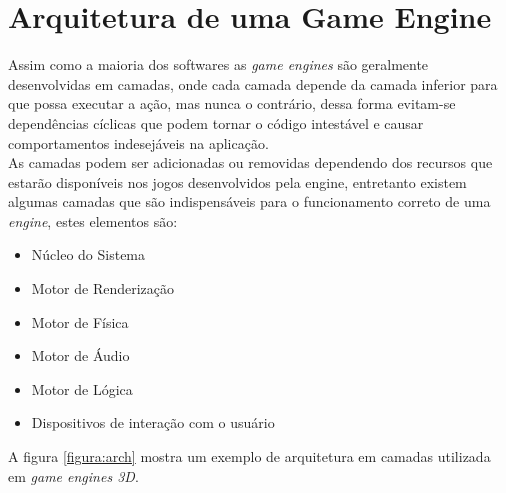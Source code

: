 \documentclass[12pt,	openright, twoside,	a4paper, english, french, spanish, brazil]{abntex2}
\begin{document}
%
%

\section{Arquitetura de uma Game Engine}
Assim como a maioria dos softwares as \textit{game engines} são geralmente desenvolvidas em camadas, onde cada camada depende da camada inferior para que possa executar a ação, mas nunca o contrário, dessa forma evitam-se dependências cíclicas que podem tornar o código intestável e causar comportamentos indesejáveis na aplicação. \\
As camadas podem ser adicionadas ou removidas dependendo dos recursos que estarão disponíveis nos jogos desenvolvidos pela engine, entretanto existem algumas camadas que são indispensáveis para o funcionamento correto de uma \textit{engine}, estes elementos são:

\begin{itemize}
\item Núcleo do Sistema
\item Motor de Renderização
\item Motor de Física
\item Motor de Áudio
\item Motor de Lógica
\item Dispositivos de interação com o usuário
\end{itemize}

 A  figura \ref{figura:arch} mostra um exemplo de arquitetura em camadas utilizada em \textit{game engines 3D}.
\end{document}
